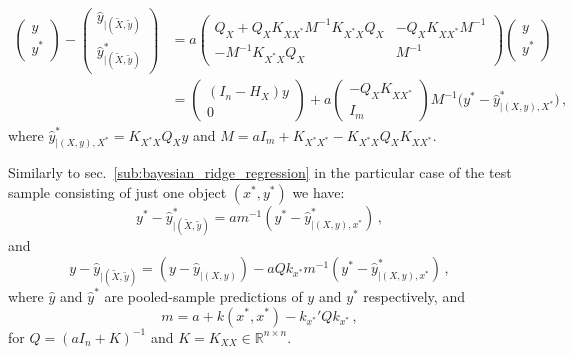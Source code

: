 \documentclass[a4paper,14pt]{article}
\newcommand{\Real}{\mathbb{R}}
\begin{document}
\begin{align*}
  \begin{pmatrix} y\\ y^* \end{pmatrix} - \begin{pmatrix}
        \hat{y}_{|(\tilde{X}, \tilde{y})} \\
        \hat{y}^*_{|(\tilde{X}, \tilde{y})}
      \end{pmatrix}
    &= a \begin{pmatrix}
        Q_X + Q_X K_{XX^*} M^{-1} K_{X^*X} Q_X & - Q_X K_{XX^*} M^{-1} \\
        - M^{-1} K_{X^*X} Q_X & M^{-1}
      \end{pmatrix}
      \begin{pmatrix} y\\ y^* \end{pmatrix} \\
    &= \begin{pmatrix} (I_n - H_X) y \\ 0 \end{pmatrix}
    + a \begin{pmatrix} - Q_X K_{XX^*} \\ I_m \end{pmatrix}
      M^{-1} \bigl( y^* - \hat{y}^*_{|(X, y), X^*} \bigr) \,,
\end{align*}
where $\hat{y}^*_{|(X, y), X^*} = K_{X^*X} Q_X y$ and
$M = aI_m + K_{X^*X^*} - K_{X^*X} Q_X K_{XX^*}$.

Similarly to sec.~\ref{sub:bayesian_ridge_regression} in the particular case of the test sample
consisting of just one object $(x^*, y^*)$ we have:
$$ y^* - \hat{y}^*_{|(\tilde{X}, \tilde{y})}
  = a m^{-1} (y^* - \hat{y}^*_{|(X, y), x^*}) \,, $$
and 
$$ y - \hat{y}_{|(\tilde{X}, \tilde{y})}
  = (y - \hat{y}_{|(X, y)}) - a Q k_{x^*} m^{-1} (y^* - \hat{y}^*_{|(X, y), x^*}) \,, $$
where $\hat{y}$ and $\hat{y}^*$ are pooled-sample predictions of $y$ and $y^*$
respectively, and
$$ m = a + k(x^*, x^*) - k_{x^*}' Q k_{x^*} \,, $$
for $Q=(aI_n + K)^{-1}$ and $K = K_{XX} \in \Real^{n\times n}$.
\end{document}
